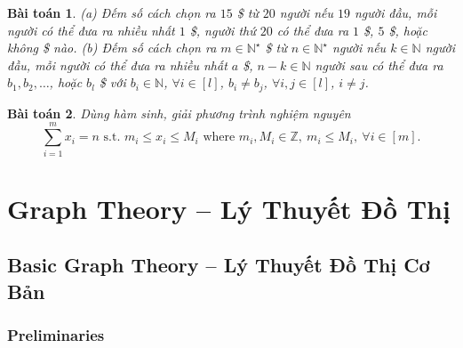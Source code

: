 \documentclass[oneside]{book}
\newtheorem{baitoan}{Bài toán}
\begin{document}
\begin{baitoan}
	(a) Đếm số cách chọn ra $15$ \$ từ $20$ người nếu $19$ người đầu, mỗi người có thể đưa ra nhiều nhất $1$ \$, người thứ $20$ có thể đưa ra $1$ \$, $5$ \$, hoặc không \$ nào. (b) Đếm số cách chọn ra $m\in\mathbb{N}^\star$ \$ từ $n\in\mathbb{N}^\star$ người nếu $k\in\mathbb{N}$ người đầu, mỗi người có thể đưa ra nhiều nhất $a$ \$, $n - k\in\mathbb{N}$ người sau có thể đưa ra $b_1,b_2,\ldots$, hoặc $b_l$ \$ với $b_i\in\mathbb{N}$, $\forall i\in[l]$, $b_i\ne b_j$, $\forall i,j\in[l]$, $i\ne j$.
\end{baitoan}

\begin{baitoan}
	Dùng hàm sinh, giải phương trình nghiệm nguyên
	\begin{equation*}
		\sum_{i=1}^m x_i = n\mbox{ s.t. } m_i\le x_i\le M_i\mbox{ where } m_i,M_i\in\mathbb{Z},\ m_i\le M_i,\ \forall i\in[m].
	\end{equation*}
\end{baitoan}


\part{Graph Theory -- Lý Thuyết Đồ Thị}


\chapter{Basic Graph Theory -- Lý Thuyết Đồ Thị Cơ Bản}


\section{Preliminaries}
\end{document}
